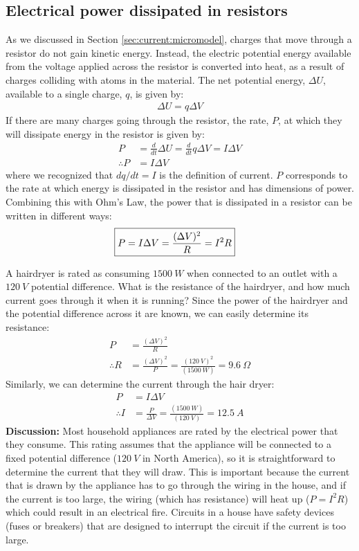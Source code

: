 \subsection{Electrical power dissipated in resistors}
As we discussed in Section \ref{sec:current:micromodel}, charges that move through a resistor do not gain kinetic energy. Instead, the electric potential energy available from the voltage applied across the resistor is converted into heat, as a result of charges colliding with atoms in the material. The net potential energy, $\Delta U$, available to a single charge, $q$, is given by:
\begin{align*}
\Delta U=q\Delta V
\end{align*}
If there are many charges going through the resistor, the rate, $P$, at which they will dissipate energy in the resistor is given by:
\begin{align*}
P&=\frac{d}{dt}\Delta U=\frac{d}{dt}q\Delta V=I\Delta V\\
\therefore P&=I\Delta V
\end{align*}
where we recognized that $dq/dt=I$ is the definition of current. $P$ corresponds to the rate at which energy is dissipated in the resistor and has dimensions of power. Combining this with Ohm's Law, the power that is dissipated in a resistor can be written in different ways:
\begin{align*}
\Aboxed{P=I \Delta V=\frac{(\Delta V)^2}{R}=I^2R}
\end{align*}
\begin{example}{A hairdryer is rated as consuming $\SI{1500}{W}$ when connected to an outlet with a $\SI{120}{V}$ potential difference. What is the resistance of the hairdryer, and how much current goes through it when it is running?}
Since the power of the hairdryer and the potential difference across it are known, we can easily determine its resistance:
\begin{align*}
P&=\frac{(\Delta V)^2}{R}\\
\therefore R&=\frac{(\Delta V)^2}{P}=\frac{(\SI{120}{V})^2}{(\SI{1500}{W})}=\SI{9.6}{\Omega}
\end{align*}
Similarly, we can determine the current through the hair dryer:
\begin{align*}
P&=I\Delta V\\
\therefore I &=\frac{P}{\Delta V}=\frac{(\SI{1500}{W})}{(\SI{120}{V})}=\SI{12.5}{A}
\end{align*}
\textbf{Discussion: }Most household appliances are rated by the electrical power that they consume. This rating assumes that the appliance will be connected to a fixed potential difference ($\SI{120}{V}$ in North America), so it is  straightforward to determine the current that they will draw. This is important because the current that is drawn by the appliance has to go through the wiring in the house, and if the current is too large, the wiring (which has resistance) will heat up ($P=I^2R$) which could result in an electrical fire. Circuits in a house have safety devices (fuses or breakers) that are designed to interrupt the circuit if the current is too large.
\end{example}

